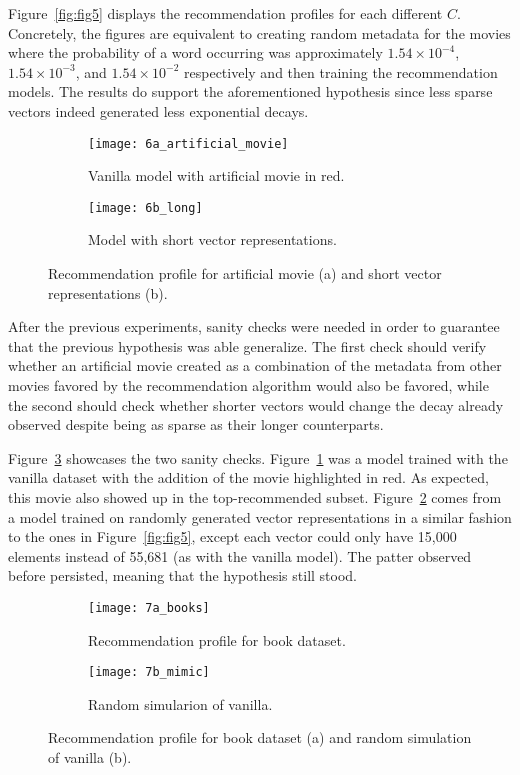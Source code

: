 Figure~\ref{fig:fig5} displays the recommendation profiles for each different
$C$. Concretely, the figures are equivalent to creating random metadata for the
movies where the probability of a word occurring was approximately
$1.54 \times 10^{-4}$, $1.54 \times 10^{-3}$, and $1.54 \times 10^{-2}$
respectively and then training the recommendation models. The results do support
the aforementioned hypothesis since less sparse vectors indeed generated less
exponential decays.

\begin{figure}
  \centering
  \begin{subfigure}{0.45\textwidth}
    \centering
    \texttt{[image: 6a\_artificial\_movie]}
    \caption{Vanilla model with artificial movie in red.\label{fig:fig6a}}
  \end{subfigure}
  \begin{subfigure}{0.45\textwidth}
    \centering
    \texttt{[image: 6b\_long]}
    \caption{Model with short vector representations.\label{fig:fig6b}}
  \end{subfigure}
  \caption{Recommendation profile for artificial movie (a) and short vector
    representations (b).\label{fig:fig6}}
\end{figure}

After the previous experiments, sanity checks were needed in order to guarantee
that the previous hypothesis was able generalize. The first check should verify
whether an artificial movie created as a combination of the metadata from other
movies favored by the recommendation algorithm would also be favored, while the
second should check whether shorter vectors would change the decay already
observed despite being as sparse as their longer counterparts.

Figure~\ref{fig:fig6} showcases the two sanity checks. Figure~\ref{fig:fig6a}
was a model trained with the vanilla dataset with the addition of the movie
highlighted in red. As expected, this movie also showed up in the
top-recommended subset. Figure~\ref{fig:fig6b} comes from a model trained on
randomly generated vector representations in a similar fashion to the ones in
Figure~\ref{fig:fig5}, except each vector could only have 15,000 elements
instead of 55,681 (as with the vanilla model). The patter observed before
persisted, meaning that the hypothesis still stood.

\begin{figure}
  \centering
  \begin{subfigure}{0.45\textwidth}
    \centering
    \texttt{[image: 7a\_books]}
    \caption{Recommendation profile for book dataset.\label{fig:fig7a}}
  \end{subfigure}
  \begin{subfigure}{0.45\textwidth}
    \centering
    \texttt{[image: 7b\_mimic]}
    \caption{Random simularion of vanilla.\label{fig:fig7b}}
  \end{subfigure}
  \caption{Recommendation profile for book dataset (a) and random simulation of
    vanilla (b).\label{fig:fig7}}
\end{figure}

